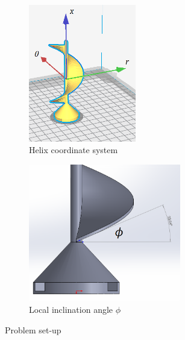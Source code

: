 \documentclass[letterpaper, 11 pt]{article}
\begin{document}
\begin{figure}[H]
\centering
\begin{subfigure}{.5\textwidth}
	\centering
	\includegraphics[height=6cm]{./helix_csys}
	\caption[Helix coordinate system]{Helix coordinate system}
	\label{fig:helix_csys}
\end{subfigure}%
\begin{subfigure}{.5\textwidth}
\centering
\includegraphics[height=6cm]{./helix_phi}
\caption{Local inclination angle $\phi$}
\label{fig:helix_phi}
\end{subfigure}
\caption{Problem set-up}
\label{probSetup}
\end{figure}
\end{document}
